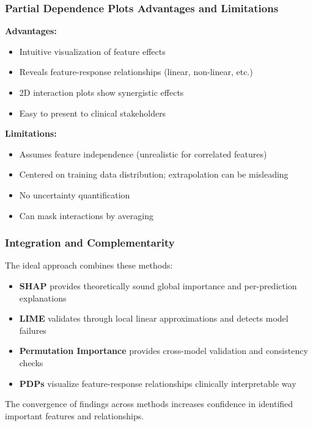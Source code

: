 \documentclass[journal]{IEEEtran}
\begin{document}
\subsubsection{Partial Dependence Plots Advantages and Limitations}

\textbf{Advantages:}
\begin{itemize}
    \item Intuitive visualization of feature effects
    \item Reveals feature-response relationships (linear, non-linear, etc.)
    \item 2D interaction plots show synergistic effects
    \item Easy to present to clinical stakeholders
\end{itemize}

\textbf{Limitations:}
\begin{itemize}
    \item Assumes feature independence (unrealistic for correlated features)
    \item Centered on training data distribution; extrapolation can be misleading
    \item No uncertainty quantification
    \item Can mask interactions by averaging
\end{itemize}

\subsubsection{Integration and Complementarity}

The ideal approach combines these methods:

\begin{itemize}
    \item \textbf{SHAP} provides theoretically sound global importance and per-prediction explanations
    \item \textbf{LIME} validates through local linear approximations and detects model failures
    \item \textbf{Permutation Importance} provides cross-model validation and consistency checks
    \item \textbf{PDPs} visualize feature-response relationships clinically interpretable way
\end{itemize}

The convergence of findings across methods increases confidence in identified important features and relationships.
\end{document}
